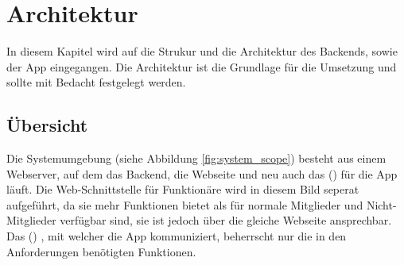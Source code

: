 %
%

\chapter{Architektur}\label{chap.architektur}
In diesem Kapitel wird auf die Strukur und die Architektur des Backends, sowie der App eingegangen. Die Architektur ist die Grundlage für die Umsetzung und sollte mit Bedacht festgelegt werden.

\section{Übersicht}\label{architektur_uebersicht}
Die Systemumgebung (siehe Abbildung \ref{fig:system_scope}) besteht aus einem Webserver, auf dem das Backend, die Webseite und neu auch das  () für die App läuft. Die Web-Schnittstelle für Funktionäre wird in diesem Bild seperat aufgeführt, da sie mehr Funktionen bietet als für normale Mitglieder und Nicht-Mitglieder verfügbar sind, sie ist jedoch über die gleiche Webseite ansprechbar. Das  () , mit welcher die App kommuniziert, beherrscht nur die in den Anforderungen benötigten Funktionen.
